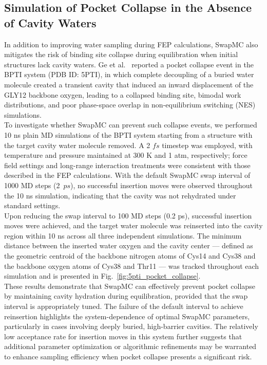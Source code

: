 \documentclass[journal=jacsat,manuscript=article]{achemso}
\begin{document}
\subsection{Simulation of Pocket Collapse in the Absence of Cavity Waters}
In addition to improving water sampling during FEP calculations, 
SwapMC also mitigates the risk of binding site collapse during equilibration when initial structures lack cavity waters. 
Ge et al.~\cite{Ge2022} reported a pocket collapse event in the BPTI system (PDB ID: 5PTI), 
in which complete decoupling of a buried water molecule created a transient cavity that induced an inward displacement of the GLY12 backbone oxygen, 
leading to a collapsed binding site, bimodal work distributions, 
and poor phase-space overlap in non-equilibrium switching (NES) simulations. \\
\newline
To investigate whether SwapMC can prevent such collapse events, 
we performed 10 ns plain MD simulations of the BPTI system starting from a structure with the target cavity water molecule removed. 
A 2 $fs$ timestep was employed, with temperature and pressure maintained at 300 K and 1 atm, respectively; 
force field settings and long-range interaction treatments were consistent with those described in the FEP calculations. 
With the default SwapMC swap interval of 1000 MD steps (2~$ps$), 
no successful insertion moves were observed throughout the 10 ns simulation, 
indicating that the cavity was not rehydrated under standard settings. \\
\newline
Upon reducing the swap interval to 100 MD steps (0.2 ps), successful insertion moves were achieved, 
and the target water molecule was reinserted into the cavity region within 10 ns across all three independent simulations. 
The minimum distance between the inserted water oxygen and the cavity center 
— defined as the geometric centroid of the backbone nitrogen atoms of Cys14 and Cys38 and the backbone oxygen atoms of Cys38 and Thr11 
— was tracked throughout each simulation and is presented in Fig.~\ref{fig:5pti_pocket_collapse}. \\
\newline
These results demonstrate that SwapMC can effectively prevent pocket collapse by maintaining cavity hydration during equilibration, 
provided that the swap interval is appropriately tuned. 
The failure of the default interval to achieve reinsertion highlights the system-dependence of optimal SwapMC parameters, 
particularly in cases involving deeply buried, high-barrier cavities. 
The relatively low acceptance rate for insertion moves in this system further suggests that additional parameter optimization or algorithmic refinements 
may be warranted to enhance sampling efficiency when pocket collapse presents a significant risk.
\end{document}
